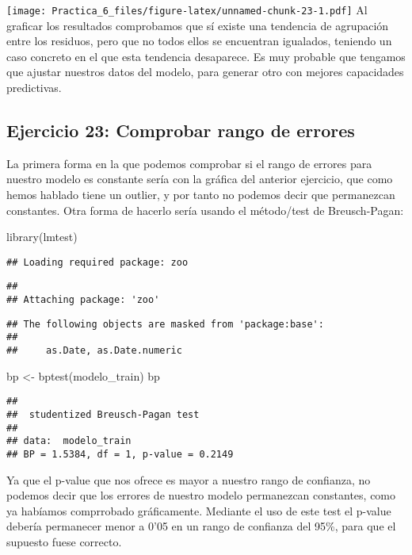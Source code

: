 \documentclass[
]{article}
\newenvironment{Shaded}{\begin{snugshade}}{\end{snugshade}}
\newcommand{\FunctionTok}[1]{\textcolor[rgb]{0.00,0.00,0.00}{#1}}
\newcommand{\NormalTok}[1]{#1}
\newcommand{\OtherTok}[1]{\textcolor[rgb]{0.56,0.35,0.01}{#1}}
\begin{document}
\texttt{[image: Practica\_6\_files/figure-latex/unnamed-chunk-23-1.pdf]}
Al graficar los resultados comprobamos que sí existe una tendencia de
agrupación entre los residuos, pero que no todos ellos se encuentran
igualados, teniendo un caso concreto en el que esta tendencia
desaparece. Es muy probable que tengamos que ajustar nuestros datos del
modelo, para generar otro con mejores capacidades predictivas.

\hypertarget{ejercicio-23-comprobar-rango-de-errores}{%
\subsection{Ejercicio 23: Comprobar rango de
errores}\label{ejercicio-23-comprobar-rango-de-errores}}

La primera forma en la que podemos comprobar si el rango de errores para
nuestro modelo es constante sería con la gráfica del anterior ejercicio,
que como hemos hablado tiene un outlier, y por tanto no podemos decir
que permanezcan constantes. Otra forma de hacerlo sería usando el
método/test de Breusch-Pagan:

\begin{Shaded}
\begin{Highlighting}[]
\FunctionTok{library}\NormalTok{(lmtest)}
\end{Highlighting}
\end{Shaded}

\begin{verbatim}
## Loading required package: zoo
\end{verbatim}

\begin{verbatim}
## 
## Attaching package: 'zoo'
\end{verbatim}

\begin{verbatim}
## The following objects are masked from 'package:base':
## 
##     as.Date, as.Date.numeric
\end{verbatim}

\begin{Shaded}
\begin{Highlighting}[]
\NormalTok{bp }\OtherTok{\textless{}{-}} \FunctionTok{bptest}\NormalTok{(modelo\_train)}
\NormalTok{bp}
\end{Highlighting}
\end{Shaded}

\begin{verbatim}
## 
##  studentized Breusch-Pagan test
## 
## data:  modelo_train
## BP = 1.5384, df = 1, p-value = 0.2149
\end{verbatim}

Ya que el p-value que nos ofrece es mayor a nuestro rango de confianza,
no podemos decir que los errores de nuestro modelo permanezcan
constantes, como ya habíamos comprrobado gráficamente. Mediante el uso
de este test el p-value debería permanecer menor a 0'05 en un rango de
confianza del 95\%, para que el supuesto fuese correcto.
\end{document}
